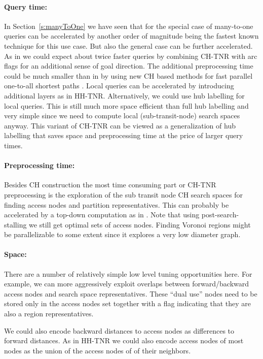 \documentclass{llncs}
\begin{document}
\paragraph*{Query time:}\label{sec:tnr-query-time}
In Section~\ref{s:manyToOne} we have seen that for the special case of many-to-one queries can be accelerated by another order of magnitude being the fastest known technique for this use case. But also the general case can be further accelerated. 
As in \cite{bdsssw-chgds-10} we could expect about twice faster queries by combining CH-TNR with arc flags for an additional sense of goal direction. The additional preprocessing time could be much smaller than in \cite{bdsssw-chgds-10} by using new CH based methods for fast parallel one-to-all shortest paths \cite{dgnw-phast-11}. Local queries can be accelerated by introducing additional layers as in HH-TNR.
Alternatively, we could use hub labelling for local queries.
This is still much more space efficient than full hub labelling and very simple since we need to compute local (sub-transit-node) search spaces anyway. 
This variant of CH-TNR can be viewed as a generalization of hub labelling that saves space and preprocessing time at the price of larger query times.

\paragraph*{Preprocessing time:} Besides CH construction the most time consuming part or CH-TNR preprocessing is the exploration of the sub transit node CH search spaces for finding access nodes and partition representatives. This can probably be accelerated by a top-down computation as in \cite{adgw-hhlsp-12}.
Note that using post-search-stalling we still get optimal sets of access nodes.
Finding Voronoi regions might be parallelizable to some extent since it explores a very low diameter graph.

\paragraph*{Space:} 
There are a number of relatively simple low level tuning opportunities here. 
For example, we can more aggressively exploit overlaps between forward/backward access nodes and search space representatives.
These ``dual use'' nodes need to be stored only in the access nodes set together with a flag indicating that they are also a region representatives.

We could also encode backward distances to access nodes as differences to forward distances. As in HH-TNR we could also encode access nodes of most nodes as the union of the access nodes of of their neighbors.
\end{document}
